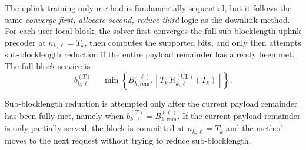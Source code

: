 \documentclass[11pt]{article}
\newcommand{\floor}[1]{\left\lfloor #1 \right\rfloor}
\newcommand{\UL}{\mathrm{UL}}
\begin{document}
The uplink training-only method is fundamentally sequential, but it follows the
same \emph{converge first, allocate second, reduce third} logic as the
downlink method. For each user-local block, the solver first converges the
full-sub-blocklength uplink precoder at $n_{k,\ell}=T_k$, then computes the
supported bits, and only then attempts sub-blocklength reduction if the entire
payload remainder has already been met. The
full-block service is
\begin{equation}
b_{k,\ell}^{(T)}
=
\min\!\left\{
B_{k,\mathrm{rem}}^{(\ell)},
\floor{T_k\,R_{k,\ell}^{(\UL)}(T_k)}
\right\}.
\label{eq:ul-full-block-service}
\end{equation}



Sub-blocklength reduction is attempted only after the current payload remainder
has been fully met, namely when
$b_{k,\ell}^{(T)} = B_{k,\mathrm{rem}}^{(\ell)}$. If the current payload remainder is
only partially served, the block is committed at $n_{k,\ell}=T_k$ and the
method moves to the next request without trying to reduce sub-blocklength.
\end{document}
